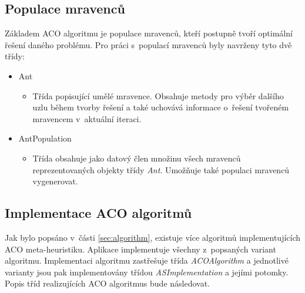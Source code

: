 \documentclass[a4paper, 12pt]{article}
\begin{document}
\subsection{Populace mravenců}
Základem ACO algoritmu je populace mravenců, kteří postupně tvoří optimální řešení daného problému. Pro práci s~populací mravenců byly navrženy tyto dvě třídy:
\begin{itemize}
  \item Ant
  \begin{itemize}
    \item[] Třída popisující umělé mravence. Obsahuje metody pro výběr dalšího uzlu během tvorby řešení a také uchovává informace o~řešení tvořeném mravencem
    v~aktuální iteraci.
  \end{itemize}
  \item AntPopulation
  \begin{itemize}
    \item[] Třída obsahuje jako datový člen množinu všech mravenců reprezentovaných objekty třídy \emph{Ant}. Umožňuje také populaci mravenců vygenerovat.
  \end{itemize}
\end{itemize}

\subsection{Implementace ACO algoritmů}
Jak bylo popsáno v~části \ref{sec:algorithm}, existuje více algoritmů implementujících ACO meta-heuristiku.
Aplikace implementuje všechny z~popsaných variant algoritmu. Implementaci algoritmu zastřešuje třída \emph{ACOAlgorithm} a jednotlivé varianty jsou pak
implementovány třídou \emph{ASImplementation} a jejími potomky. Popis tříd realizujících ACO algoritmus bude následovat.
\end{document}
